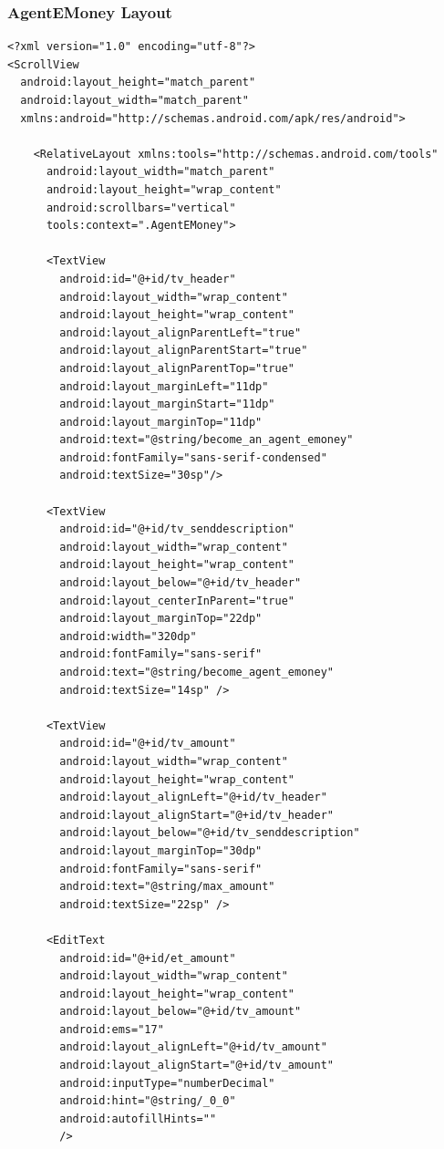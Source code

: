\documentclass[11pt, a4paper]{article}
\begin{document}
\begin{appendices}
\subsubsection{AgentEMoney Layout}
\begin{lstlisting}
<?xml version="1.0" encoding="utf-8"?>
<ScrollView
  android:layout_height="match_parent"
  android:layout_width="match_parent"
  xmlns:android="http://schemas.android.com/apk/res/android">

    <RelativeLayout xmlns:tools="http://schemas.android.com/tools"
      android:layout_width="match_parent"
      android:layout_height="wrap_content"
      android:scrollbars="vertical"
      tools:context=".AgentEMoney">

      <TextView
        android:id="@+id/tv_header"
        android:layout_width="wrap_content"
        android:layout_height="wrap_content"
        android:layout_alignParentLeft="true"
        android:layout_alignParentStart="true"
        android:layout_alignParentTop="true"
        android:layout_marginLeft="11dp"
        android:layout_marginStart="11dp"
        android:layout_marginTop="11dp"
        android:text="@string/become_an_agent_emoney"
        android:fontFamily="sans-serif-condensed"
        android:textSize="30sp"/>

      <TextView
        android:id="@+id/tv_senddescription"
        android:layout_width="wrap_content"
        android:layout_height="wrap_content"
        android:layout_below="@+id/tv_header"
        android:layout_centerInParent="true"
        android:layout_marginTop="22dp"
        android:width="320dp"
        android:fontFamily="sans-serif"
        android:text="@string/become_agent_emoney"
        android:textSize="14sp" />

      <TextView
        android:id="@+id/tv_amount"
        android:layout_width="wrap_content"
        android:layout_height="wrap_content"
        android:layout_alignLeft="@+id/tv_header"
        android:layout_alignStart="@+id/tv_header"
        android:layout_below="@+id/tv_senddescription"
        android:layout_marginTop="30dp"
        android:fontFamily="sans-serif"
        android:text="@string/max_amount"
        android:textSize="22sp" />

      <EditText
        android:id="@+id/et_amount"
        android:layout_width="wrap_content"
        android:layout_height="wrap_content"
        android:layout_below="@+id/tv_amount"
        android:ems="17"
        android:layout_alignLeft="@+id/tv_amount"
        android:layout_alignStart="@+id/tv_amount"
        android:inputType="numberDecimal"
        android:hint="@string/_0_0"
        android:autofillHints=""
        />


\end{lstlisting}
\end{appendices}
\end{document}
